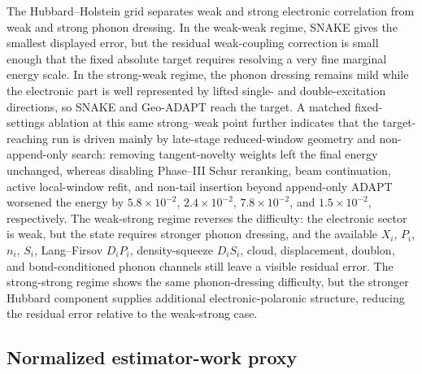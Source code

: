 \documentclass[
  reprint,
  amsmath,
  amssymb,
  aps,
  pra,
  nofootinbib,
  superscriptaddress,
  floatfix
]{revtex4-2}
\begin{document}
\begin{widetext}
The Hubbard--Holstein grid separates weak and strong electronic correlation from weak and strong phonon dressing. In the weak-weak regime, SNAKE gives the smallest displayed error, but the residual weak-coupling correction is small enough that the fixed absolute target requires resolving a very fine marginal energy scale. In the strong-weak regime, the phonon dressing remains mild while the electronic part is well represented by lifted single- and double-excitation directions, so SNAKE and Geo-ADAPT reach the target. A matched fixed-settings ablation at this same strong--weak point further indicates that the target-reaching run is driven mainly by late-stage reduced-window geometry and non-append-only search: removing tangent-novelty weights left the final energy unchanged, whereas disabling Phase--III Schur reranking, beam continuation, active local-window refit, and non-tail insertion beyond append-only ADAPT worsened the energy by \(5.8\times 10^{-2}\), \(2.4\times 10^{-2}\), \(7.8\times 10^{-2}\), and \(1.5\times 10^{-2}\), respectively. The weak-strong regime reverses the difficulty: the electronic sector is weak, but the state requires stronger phonon dressing, and the available \(X_i\), \(P_i\), \(n_i\), \(S_i\), Lang--Firsov \(D_iP_i\), density-squeeze \(D_iS_i\), cloud, displacement, doublon, and bond-conditioned phonon channels still leave a visible residual error. The strong-strong regime shows the same phonon-dressing difficulty, but the stronger Hubbard component supplies additional electronic-polaronic structure, reducing the residual error relative to the weak-strong case.
\end{widetext}

\subsection{Normalized estimator-work proxy}
\end{document}
